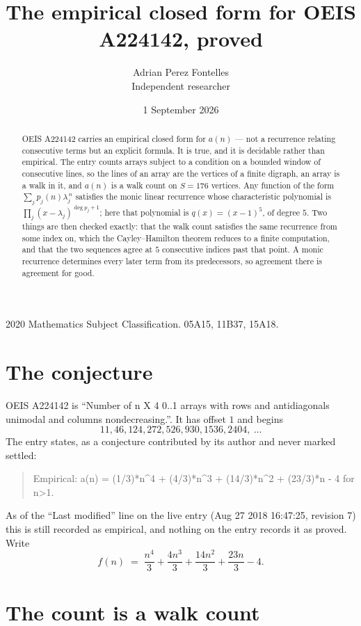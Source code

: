 \documentclass[11pt,a4paper]{article}
\title{The empirical closed form for OEIS A224142, proved}
\author{Adrian Perez Fontelles\\ \small Independent researcher}
\date{1 September 2026}
\theoremstyle{plain}
\theoremstyle{definition}
\begin{document}
\maketitle

\begin{abstract}
OEIS A224142 carries an empirical closed form for $a(n)$ --- not a recurrence relating
consecutive terms but an explicit formula. It is true, and it is decidable rather than
empirical. The entry counts arrays subject to a condition on a bounded window of consecutive lines, so the lines of an array are the
vertices of a finite digraph, an array is a walk in it, and $a(n)$ is a walk count on
$S=176$ vertices. Any function of the form $\sum_j p_j(n)\lambda_j^{\,n}$ satisfies the
monic linear recurrence whose characteristic polynomial is
$\prod_j(x-\lambda_j)^{\deg p_j+1}$; here that polynomial is $q(x)=(x-1)^{5}$, of degree
$5$. Two things are then checked exactly: that the walk count satisfies the same
recurrence from some index on, which the Cayley--Hamilton theorem reduces to a finite
computation, and that the two sequences agree at $5$ consecutive indices past that
point. A monic recurrence determines every later term from its predecessors, so agreement
there is agreement for good.
\end{abstract}

\noindent\small 2020 Mathematics Subject Classification. 05A15, 11B37, 15A18.\normalsize

\section{The conjecture}

OEIS A224142 is ``Number of n X 4 0..1 arrays with rows and antidiagonals unimodal and columns nondecreasing.''. It has offset $1$ and begins
\[
11, 46, 124, 272, 526, 930, 1536, 2404,\ \dots
\]
The entry states, as a conjecture contributed by its author and never marked settled:
\begin{quote}
Empirical: a(n) = (1/3)*n\^{}4 + (4/3)*n\^{}3 + (14/3)*n\^{}2 + (23/3)*n - 4 for n>1.
\end{quote}
As of the ``Last modified'' line on the live entry (Aug 27 2018 16:47:25, revision 7) this is still
recorded as empirical, and nothing on the entry records it as proved. Write
\[
f(n)\;=\;\frac{n^{4}}{3} + \frac{4 n^{3}}{3} + \frac{14 n^{2}}{3} + \frac{23 n}{3} - 4.
\]

\section{The count is a walk count}
\end{document}
